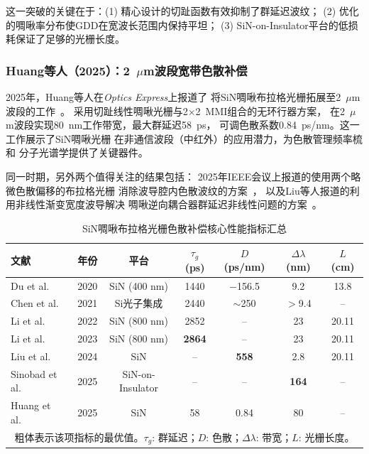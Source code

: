 \documentclass[12pt,a4paper,twoside]{article}
\begin{document}
这一突破的关键在于：(1) 精心设计的切趾函数有效抑制了群延迟波纹；
(2) 优化的啁啾率分布使GDD在宽波长范围内保持平坦；
(3) SiN-on-Insulator平台的低损耗保证了足够的光栅长度。

\subsubsection{Huang等人（2025）：2~$\mu$m波段宽带色散补偿}

2025年，Huang等人在\textit{Optics Express}上报道了
将SiN啁啾布拉格光栅拓展至2~$\mu$m波段的工作~\cite{huang2025}。
采用切趾线性啁啾光栅与2$\times$2~MMI组合的无环行器方案，
在2~$\mu$m波段实现80~nm工作带宽，最大群延迟58~ps，
可调色散系数0.84~ps/nm。这一工作展示了SiN啁啾光栅
在非通信波段（中红外）的应用潜力，为色散管理频率梳和
分子光谱学提供了关键器件。

同一时期，另外两个值得关注的结果包括：
2025年IEEE会议上报道的使用两个略微色散偏移的布拉格光栅
消除波导腔内色散波纹的方案~\cite{ripple2025}，
以及Liu等人报道的利用非线性渐变宽度波导解决
啁啾逆向耦合器群延迟非线性问题的方案~\cite{liu2023contra}。

\begin{table}[p]
\centering
\caption{SiN啁啾布拉格光栅色散补偿核心性能指标汇总}
\label{tab:performance_summary}
\begin{tabular}{lcccccc}
\toprule
\textbf{文献} & \textbf{年份} & \textbf{平台} & \textbf{$\tau_g$ (ps)} & \textbf{$D$ (ps/nm)} & \textbf{$\Delta\lambda$ (nm)} & \textbf{$L$ (cm)} \\
\midrule
Du et al.~\cite{du2020} & 2020 & SiN (400 nm) & 1440 & $-$156.5 & 9.2 & 13.8 \\
Chen et al.~\cite{chen2021} & 2021 & Si光子集成 & 2440 & $\sim$250 & $>$9.4 & -- \\
Li et al.~\cite{li2022} & 2022 & SiN (800 nm) & 2852 & -- & 23 & 20.11 \\
Li et al.~\cite{li2023} & 2023 & SiN (800 nm) & \textbf{2864} & -- & 23 & 20.11 \\
Liu et al.~\cite{liu2024a} & 2024 & SiN & -- & \textbf{558} & 2.8 & 20.11 \\
Sinobad et al.~\cite{sinobad2025} & 2025 & SiN-on-Insulator & -- & -- & \textbf{164} & -- \\
Huang et al.~\cite{huang2025} & 2025 & SiN & 58 & 0.84 & 80 & -- \\
\bottomrule
\multicolumn{7}{c}{\small 粗体表示该项指标的最优值。$\tau_g$: 群延迟；$D$: 色散；$\Delta\lambda$: 带宽；$L$: 光栅长度。}
\end{tabular}
\end{table}
\end{document}

